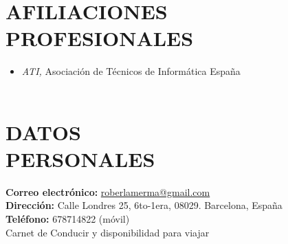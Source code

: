 \documentclass[line,margin]{res}
\begin{document}
\begin{resume}
\section{AFILIACIONES \\PROFESIONALES\\}
              \begin{itemize}  \itemsep 2pt %
               \item \textit{ATI,} Asociaci\'{o}n de T\'{e}cnicos de Inform\'{a}tica \hfill Espa\~{n}a
               \\
               \\
               \end{itemize}
 
\section{DATOS \\ PERSONALES\\}  
               

               \textbf{Correo electr\'{o}nico:} \href{mailto:roberlamerma@gmail.com}{roberlamerma@gmail.com} \\
               \textbf{Direcci\'{o}n:} Calle Londres 25, 6to-1era, 08029. Barcelona, Espa\~{n}a\\
               \textbf{Tel\'{e}fono:} 678714822 (m\'{o}vil)\\
               Carnet de Conducir y disponibilidad para viajar\\


\end{resume}
\end{document}
